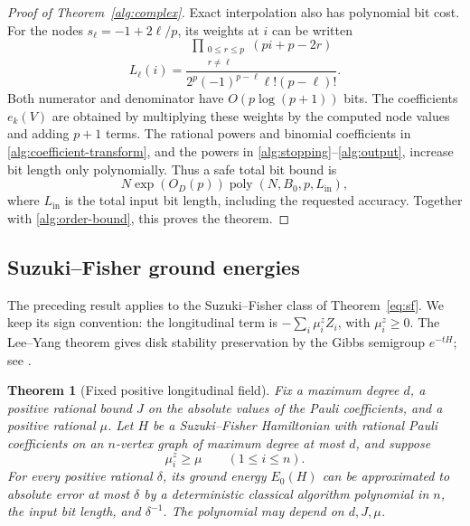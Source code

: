 \documentclass[reqno]{amsart}
\newtheorem{theorem}{Theorem}[section]
\theoremstyle{definition}
\theoremstyle{remark}
\begin{document}
\begin{proof}[Proof of Theorem~\ref{alg:complex}]
Exact interpolation also has polynomial bit cost.
For the nodes \(s_\ell=-1+2\ell/p\), its weights at \(i\)
can be written
\begin{equation}
 L_\ell(i)=
 \frac{\displaystyle
       \prod_{\substack{0\le r\le p\\r\ne\ell}}
           (pi+p-2r)}
      {2^p(-1)^{p-\ell}\ell!(p-\ell)!}.
 \label{alg:interpolation-weights}
\end{equation}
Both numerator and denominator have
\(O(p\log(p+1))\) bits.
The coefficients \(e_k(V)\) are obtained by multiplying these
weights by the computed node values and adding \(p+1\) terms.
The rational powers and binomial coefficients in
\eqref{alg:coefficient-transform}, and the powers in
\eqref{alg:stopping}--\eqref{alg:output}, increase bit length
only polynomially.
Thus a safe total bit bound is
\[
 N\exp(O_D(p))\operatorname{poly}(N,B_0,p,L_{\mathrm{in}}),
 \]
where \(L_{\mathrm{in}}\) is the total input bit length,
including the requested accuracy.
Together with \eqref{alg:order-bound}, this proves the theorem.
\end{proof}

\subsection{Suzuki--Fisher ground energies}
\label{alg:sf-subsection}

The preceding result applies to the Suzuki--Fisher class of
Theorem~\ref{eq:sf}.  We keep its sign convention:
the longitudinal term is
\(-\sum_i\mu_i^z Z_i\), with \(\mu_i^z\ge0\).
The Lee--Yang theorem gives disk stability preservation by the
Gibbs semigroup \(e^{-tH}\); see
\cite{SuzukiFisher71,WBG26,BGLW26}.

\begin{theorem}[Fixed positive longitudinal field]
\label{alg:sf}
Fix a maximum degree \(d\), a positive rational bound \(J\) on
the absolute values of the Pauli coefficients, and a positive
rational \(\mu\).
Let \(H\) be a Suzuki--Fisher Hamiltonian with rational Pauli
coefficients on an \(n\)-vertex graph of maximum degree at most
\(d\), and suppose
\[
 \mu_i^z\ge\mu\qquad(1\le i\le n).
 \]
For every positive rational \(\delta\), its ground energy
\(E_0(H)\) can be approximated to absolute error at most
\(\delta\) by a deterministic classical algorithm polynomial in
\(n\), the input bit length, and \(\delta^{-1}\).
The polynomial may depend on \(d,J,\mu\).
\end{theorem}
\end{document}
